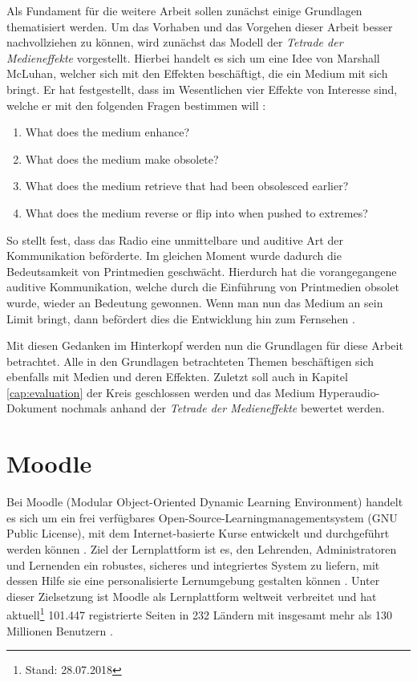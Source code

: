 \label{cha:grundlagen}
Als Fundament für die weitere Arbeit sollen zunächst einige Grundlagen thematisiert werden. Um das Vorhaben und das Vorgehen dieser Arbeit besser nachvollziehen zu können, wird zunächst das Modell der \textit{Tetrade der Medieneffekte} vorgestellt. Hierbei handelt es sich um eine Idee von Marshall McLuhan, welcher sich mit den Effekten beschäftigt, die ein Medium mit sich bringt. Er hat festgestellt, dass im Wesentlichen vier Effekte von Interesse sind, welche er mit den folgenden Fragen bestimmen will \citep{mcluhan1977laws}:

\begin{enumerate}
\item What does the medium enhance?
\item What does the medium make obsolete?
\item What does the medium retrieve that had been obsolesced earlier?
\item What does the medium reverse or flip into when pushed to extremes?
\end{enumerate}

So stellt \cite{mcluhan1977laws} fest, dass das Radio eine unmittelbare und auditive Art der Kommunikation beförderte. Im gleichen Moment wurde dadurch die Bedeutsamkeit von Printmedien geschwächt. Hierdurch hat die vorangegangene auditive Kommunikation, welche durch die Einführung von Printmedien obsolet wurde, wieder an Bedeutung gewonnen. Wenn man nun das Medium an sein Limit bringt, dann befördert dies die Entwicklung hin zum Fernsehen \citep{mcluhan1977laws}.

Mit diesen Gedanken im Hinterkopf werden nun die Grundlagen für diese Arbeit betrachtet. Alle in den Grundlagen betrachteten Themen beschäftigen sich ebenfalls mit Medien und deren Effekten. Zuletzt soll auch in Kapitel \ref{cap:evaluation} der Kreis geschlossen werden und das Medium Hyperaudio-Dokument nochmals anhand der \textit{Tetrade der Medieneffekte} bewertet werden.

\section{Moodle}
\label{sec:moodle}
Bei Moodle (Modular Object-Oriented Dynamic Learning Environment) handelt es sich um ein frei verfügbares Open-Source-Learningmanagementsystem (GNU Public License), mit dem Internet-basierte Kurse entwickelt und durchgeführt werden können \citep{moodle2015was}. Ziel der Lernplattform ist es, den Lehrenden, Administratoren und Lernenden ein robustes, sicheres und integriertes System zu liefern, mit dessen Hilfe sie eine personalisierte Lernumgebung gestalten können \citep{moodle2018about}. Unter dieser Zielsetzung ist Moodle als Lernplattform weltweit verbreitet und hat aktuell\footnote{Stand: 28.07.2018} 101.447 registrierte Seiten in 232 Ländern mit insgesamt mehr als 130 Millionen Benutzern \citep{moodle2018stats}.


